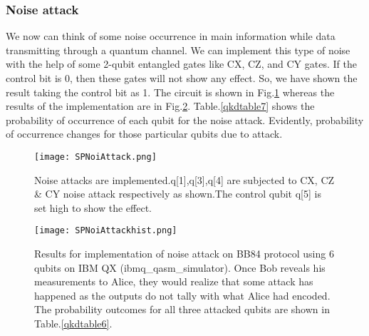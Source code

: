 \documentclass[superscriptaddress,twocolumn,showpacs,prb,floatfix]{revtex4}
\begin{document}
\subsubsection{Noise attack}
\label{SecIIBii}

We now can think of some noise occurrence in main information while data transmitting through a quantum channel. We can implement this type of noise with the help of some 2-qubit entangled gates like CX, CZ, and CY gates. If the control bit is 0, then these gates will not show any effect. So, we have shown the result taking the control bit as 1. The circuit is shown in Fig.\ref{SPNoiAttack} whereas the results of the implementation are in Fig.\ref{SPNoiAttackhist}. Table.\ref{qkdtable7} shows the probability of occurrence of each qubit for the noise attack. Evidently, probability of occurrence changes for those particular qubits due to attack. 
\begin{figure}[H]
    \centering
    \texttt{[image: SPNoiAttack.png]}
    \caption{Noise attacks are implemented.q[1],q[3],q[4] are subjected to  CX, CZ \& CY noise attack respectively as shown.The control qubit q[5] is set high to show the effect.}
    \label{SPNoiAttack}
\end{figure}
\begin{figure}[H]
    \centering
    \texttt{[image: SPNoiAttackhist.png]}
    \caption{Results for implementation of noise attack on BB84 protocol using 6 qubits on IBM QX (ibmq\_qasm\_simulator). Once Bob reveals his measurements to Alice, they would realize that some attack has happened as the outputs do not tally with what Alice had encoded. The probability outcomes for all three attacked qubits are shown in Table.\ref{qkdtable6}.}
    \label{SPNoiAttackhist}
\end{figure}
\end{document}
